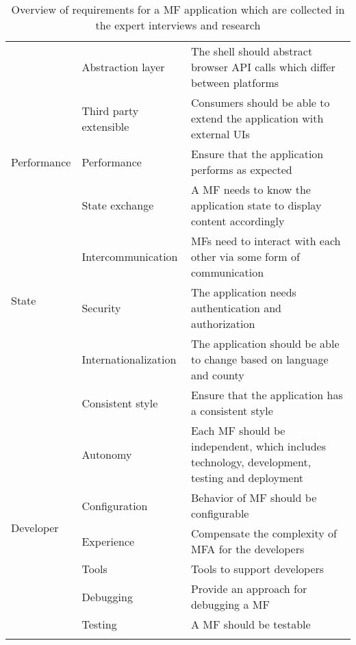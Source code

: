 \begin{longtable}{|l|l|p{}|}
	                              & Abstraction layer      & The shell should abstract browser \ac{API} calls which differ between platforms                    \\ \cline{2-3}
	                              & Third party extensible & Consumers should be able to extend the application with external UIs                               \\ \hline
	Performance                   & Performance            & Ensure that the application performs as expected                                                   \\ \hline
	\multirow{5}{*}{State}        & State exchange         & A \ac{MF} needs to know the application state to display content accordingly                       \\ \cline{2-3}
	                              & Intercommunication     & MFs need to interact with each other via some form of communication                                \\ \cline{2-3}
	                              & Security               & The application needs authentication and authorization                                             \\ \cline{2-3}
	                              & Internationalization   & The application should be able to change based on language and county                              \\ \cline{2-3}
	                              & Consistent style       & Ensure that the application has a consistent style                                                 \\ \hline
	\multirow{6}{*}{Developer}    & Autonomy               & Each \ac{MF} should be independent, which includes technology, development, testing and deployment \\ \cline{2-3}
	                              & Configuration          & Behavior of \ac{MF} should be configurable                                                         \\ \cline{2-3}
	                              & Experience             & Compensate the complexity of \ac{MFA} for the developers                                           \\ \cline{2-3}
	                              & Tools                  & Tools to support developers                                                                        \\ \cline{2-3}
	                              & Debugging              & Provide an approach for debugging a \ac{MF}                                                        \\ \cline{2-3}
	                              & Testing                & A \ac{MF} should be testable                                                                       \\ \hline

	\caption{Overview of requirements for a \ac{MF} application which are collected in the expert interviews and research}
	\label{tbl:overview_requirements}
\end{longtable}
\setlength{\tabcolsep}{\spaltenabstand}
